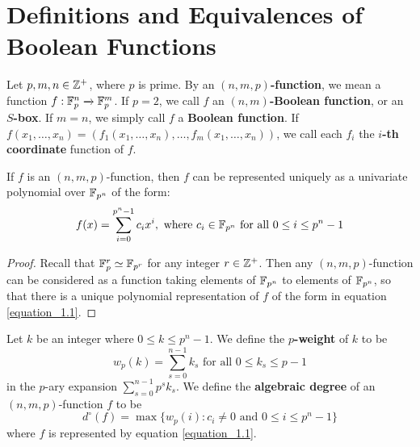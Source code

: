 \section{Definitions and Equivalences of Boolean Functions}\label{section_1.1}

\begin{definition}
  Let $p,m, n \in \mathbb{Z}^+$, where $p$ is prime. By an \textbf{$(n,m,p)$-function},
  we mean a function $f:\mathbb{F}_p^n \xrightarrow{} \mathbb{F}_p^m$. If $p=2$, we call $f$ an
  \textbf{$(n,m)$-Boolean function}, or an \textbf{$S$-box}. If $m=n$, we simply
  call  $f$ a  \textbf{Boolean function}. If  $f(x_1, \dots, x_n)=(f_1(x_1,
  \dots, x_n), \dots, f_m(x_1, \dots, x_n))$, we call each $f_i$ the
  \textbf{$i$-th coordinate} function of $f$.
\end{definition}

\begin{lemma}\label{lemma_1.1.1}
  If $f$ is an  $(n,m,p)$-function, then $f$ can be represented uniquely as a
  univariate polynomial over  $\mathbb{F}_{p^n}$ of the form:
  \begin{equation}\label{equation_1.1}
    f(x)=\sum_{i=0}^{p^n-1}{c_ix^i},  \text{ where } c_i \in \mathbb{F}_{p^n}
    \text{ for all } 0 \leq i \leq p^n-1
  \end{equation}
\end{lemma}
\begin{proof}
  Recall that $\mathbb{F}_p^r \simeq \mathbb{F}_{p^r}$ for any integer $r \in \mathbb{Z}^+$. Then any
  $(n,m,p)$-function can be considered as a function taking elements of
  $\mathbb{F}_{p^n}$ to elements of $\mathbb{F}_{p^n}$, so that there is a unique polynomial
  representation of $f$ of the form in equation \ref{equation_1.1}.
\end{proof}

\begin{defintion}
  Let $k$ be an integer where $0 \leq k \leq p^n-1$. We define the
  \textbf{$p$-weight} of $k$ to be
  \begin{equation}\label{equation_1.2}
    w_p(k)=\sum_{s=0}^{n-1}{k_s} \text{ for all } 0 \leq k_s \leq p-1
  \end{equation}
  in the $p$-ary expansion  $\sum_{s=0}^{n-1}{p^sk_s}$. We define the
  \textbf{algebraic degree} of an $(n,m,p)$-function $f$ to be
  \begin{equation}\label{equation_2.3}
    d^\circ(f)=\max{\{w_p(i) : c_i \neq 0 \text{ and } 0 \leq i \leq p^n-1\}}
  \end{equation}
  where $f$ is represented by equation \ref{equation_1.1}.
\end{defintion}

